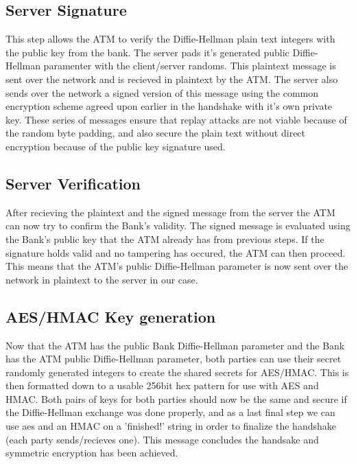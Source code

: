 	\subsection{Server Signature}\label{sec:servsig}
		This step allows the ATM to verify the Diffie-Hellman plain text integers with the public key from the bank. The server pads it's generated public Diffie-Hellman
		paramenter with the client/server randoms. This plaintext message is sent over the network and is recieved in plaintext by the ATM. The server also sends over the network a signed version of this message using the common encryption scheme agreed upon earlier in the handshake with it's own private key. These series of messages ensure that replay attacks are not viable because of the random byte padding, and also secure the plain text without direct encryption because of the public key signature used.
		
	\subsection{Server Verification}\label{sec:servconf}
		After recieving the plaintext and the signed message from the server the ATM can now try to confirm the Bank's validity. The signed message is evaluated using the Bank's public key that the ATM already has from previous steps. If the signature holds valid and no tampering has occured, the ATM can then proceed. This means that the ATM's public Diffie-Hellman parameter is now sent over the network in plaintext to the server in our case.
	
	\subsection{AES/HMAC Key generation}\label{sec:keygen}
		Now that the ATM has the public Bank Diffie-Hellman parameter and the Bank has the ATM public Diffie-Hellman parameter, both parties can use their secret randomly generated integers to create the shared secrets for AES/HMAC. This is then formatted down to a usable 256bit hex pattern for use with AES and HMAC. Both pairs of keys for both  parties should now be the same and secure if the Diffie-Hellman exchange was done properly, and as a last final step we can use aes and an HMAC on a 'finished!' string in order to finalize the handshake (each party sends/recieves one). This message concludes the handsake and symmetric encryption has been achieved.